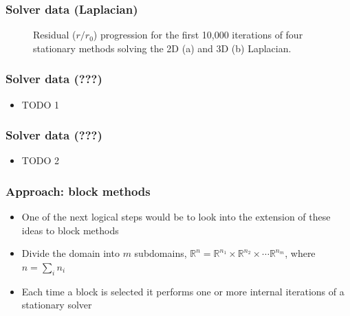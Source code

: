 \documentclass{beamer}
\begin{document}
\begin{frame}
	\frametitle{Solver data (Laplacian)}
	\begin{figure}[H]
		\centering
		\caption{Residual ($r / r_0$) progression for the first 10,000 iterations of four stationary methods solving the 2D (a) and 3D (b) Laplacian.}
	\end{figure}
\end{frame}

\begin{frame}
	\frametitle{Solver data (???)}
	\begin{itemize}
	    \item TODO 1
	\end{itemize}
\end{frame}

\begin{frame}
	\frametitle{Solver data (???)}
	\begin{itemize}
	    \item TODO 2
	\end{itemize}
\end{frame}

\begin{frame}
	\frametitle{Approach: block methods}
	\begin{itemize}
	    \item One of the next logical steps would be to look into the extension of these ideas to block methods
		\item Divide the domain into $m$ subdomains, $\mathbb{R}^n = \mathbb{R}^{n_1} \times \mathbb{R}^{n_2} \times \cdots \mathbb{R}^{n_m}$, where $n = \sum_i n_i$
		\item Each time a block is selected it performs one or more internal iterations of a stationary solver
	\end{itemize}
\end{frame}
\end{document}
